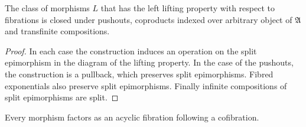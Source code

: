 \documentclass{tac}
\newcommand\ambient{\mathfrak A}
\begin{document}
\begin{lemma} The class of morphisms $L$ that has the left lifting property with respect to fibrations is closed under pushouts, coproducts indexed over arbitrary object of $\ambient$ and transfinite compositions. \label{saturation}
\end{lemma}

\begin{proof}
In each case the construction induces an operation on the split epimorphism in the diagram of the lifting property. 
In the case of the pushouts, the construction is a pullback, which preserves split epimorphisms.
Fibred exponentials also preserve split epimorphisms. Finally infinite compositions of split epimorphisms are split.
\end{proof}


\begin{proposition} Every morphism factors as an acyclic fibration following a cofibration. \label{factor1} \end{proposition}
\end{document}
